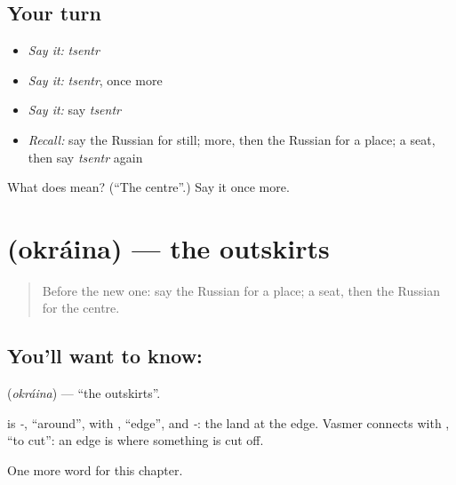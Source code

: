 \subsection*{Your turn}
\begin{itemize}
\raggedright
  \item \emph{Say it:} \emph{tsentr}
  \item \emph{Say it:} \emph{tsentr}, once more
  \item \emph{Say it:} say \emph{tsentr}
  \item \emph{Recall:} say the Russian for still; more, then the Russian for a place; a seat, then say \emph{tsentr} again
\end{itemize}

\begin{tcolorbox}[breakable,colback=teal!4,colframe=teal!35!black,title={Before you move on}]
What does  mean? (\textquotedblleft{}The centre\textquotedblright{}.) Say it once more.
\end{tcolorbox}
\section[\texorpdfstring{\ru{окраина} (okráina)}{окраина (okráina)}]{ (okráina) — the outskirts}

\label{lesson:RU-C151-okraina}



\begin{quote}
Before the new one: say the Russian for a place; a seat, then the Russian for the centre.
\end{quote}

\subsection*{You'll want to know: }
\textbf{} (\emph{okráina}) — \textquotedblleft{}the outskirts\textquotedblright{}.

\begin{cousinweb}
\textbf{} is \emph{-}, \textquotedblleft{}around\textquotedblright{}, with \emph{}, \textquotedblleft{}edge\textquotedblright{}, and \emph{-}: the land at the edge. Vasmer connects \emph{} with \emph{}, \textquotedblleft{}to cut\textquotedblright{}: an edge is where something is cut off.
\end{cousinweb}

\begin{grammarlens}[title={What you've built}]
One more word for this chapter.
\end{grammarlens}

